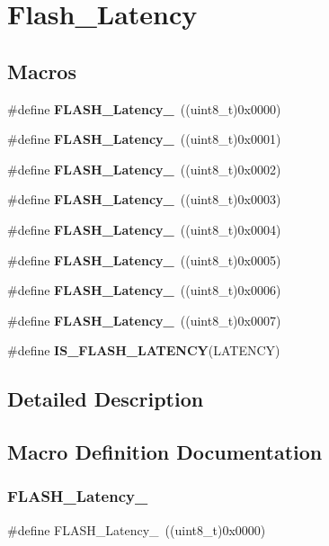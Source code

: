 \section{Flash\+\_\+\+Latency}
\label{group__Flash__Latency}
\subsection*{Macros}
\begin{DoxyCompactItemize}
\item 
\#define \textbf{ F\+L\+A\+S\+H\+\_\+\+Latency\+\_}~((uint8\+\_\+t)0x0000)
\item 
\#define \textbf{ F\+L\+A\+S\+H\+\_\+\+Latency\+\_}~((uint8\+\_\+t)0x0001)
\item 
\#define \textbf{ F\+L\+A\+S\+H\+\_\+\+Latency\+\_}~((uint8\+\_\+t)0x0002)
\item 
\#define \textbf{ F\+L\+A\+S\+H\+\_\+\+Latency\+\_}~((uint8\+\_\+t)0x0003)
\item 
\#define \textbf{ F\+L\+A\+S\+H\+\_\+\+Latency\+\_}~((uint8\+\_\+t)0x0004)
\item 
\#define \textbf{ F\+L\+A\+S\+H\+\_\+\+Latency\+\_}~((uint8\+\_\+t)0x0005)
\item 
\#define \textbf{ F\+L\+A\+S\+H\+\_\+\+Latency\+\_}~((uint8\+\_\+t)0x0006)
\item 
\#define \textbf{ F\+L\+A\+S\+H\+\_\+\+Latency\+\_}~((uint8\+\_\+t)0x0007)
\item 
\#define \textbf{ I\+S\+\_\+\+F\+L\+A\+S\+H\+\_\+\+L\+A\+T\+E\+N\+CY}(L\+A\+T\+E\+N\+CY)
\end{DoxyCompactItemize}


\subsection{Detailed Description}


\subsection{Macro Definition Documentation}
\mbox{\label{group__Flash__Latency_ga09afe6e52b819cc074f6111ec42ac3c3}} 
\subsubsection{F\+L\+A\+S\+H\+\_\+\+Latency\+\_}
{\footnotesize\ttfamily \#define F\+L\+A\+S\+H\+\_\+\+Latency\+\_~((uint8\+\_\+t)0x0000)}

